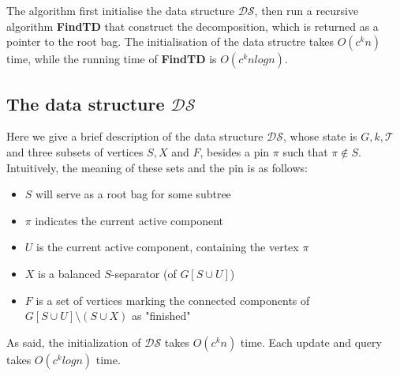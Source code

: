 \documentclass{article}
\theoremstyle{definition}
\theoremstyle{lemma}
\theoremstyle{corollary}
\theoremstyle{theorem}
\begin{document}
\bigskip
The algorithm first initialise the data structure $\mathcal{DS}$, then run a recursive algorithm
\textbf{FindTD} that construct the decomposition, which is returned as a pointer to the root bag. The
initialisation of the data structre takes $O(c^k n)$ time, while the running time of \textbf{FindTD} is
$O(c^k nlogn)$.

\subsection{The data structure $\mathcal{DS}$}
Here we give a brief description of the data structure $\mathcal{DS}$, whose state is $G,k,\mathcal{T}$ and three subsets of vertices $S,X$ and $F$, besides a pin $\pi$ such that $\pi \not \in S$.
Intuitively, the meaning of these sets and the pin is as follows:
\begin{itemize}
	\item $S$ will serve as a root bag for some subtree
	\item $\pi$ indicates the current active component
	\item $U$ is the current active component, containing the vertex $\pi$
	\item $X$ is a balanced $S$-separator (of $G[S \cup U]$)
	\item $F$ is a set of vertices marking the connected components of $G[S \cup U] \setminus (S \cup X)$
	as "finished"
\end{itemize}
As said, the initialization of $\mathcal{DS}$ takes $O(c^k n)$ time. Each update and query takes
$O(c^k logn)$ time.
\end{document}
